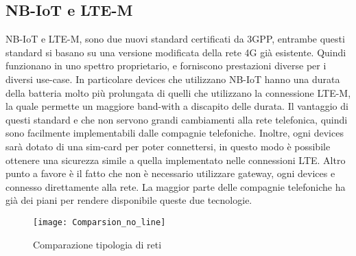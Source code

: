 \subsection{NB-IoT e LTE-M}
NB-IoT e LTE-M, sono due nuovi standard certificati da 3GPP, entrambe questi
standard si basano su una versione modificata della rete 4G già esistente.
Quindi funzionano in uno spettro proprietario, e forniscono prestazioni diverse
per i diversi use-case. In particolare devices che utilizzano NB-IoT hanno una
durata della batteria molto più prolungata di quelli che utilizzano la
connessione LTE-M, la quale permette un maggiore band-with a discapito delle
durata. Il vantaggio di questi standard e che non servono grandi cambiamenti
alla rete telefonica, quindi sono facilmente implementabili dalle compagnie
telefoniche. Inoltre, ogni devices sarà dotato di una sim-card per poter
connettersi, in questo modo è possibile ottenere  una sicurezza simile a quella
implementato nelle connessioni LTE.
Altro punto a favore è il fatto che non è necessario utilizzare gateway, ogni
devices e connesso direttamente alla rete. 
La maggior parte delle compagnie telefoniche ha già dei piani per rendere disponibile queste due
tecnologie.

\begin{figure}[h]
        \centering 
                \texttt{[image: Comparsion\_no\_line]}
        \caption{Comparazione tipologia di reti}
\end{figure}

